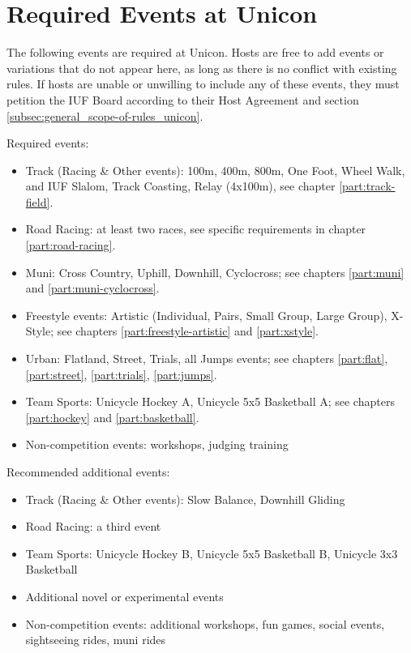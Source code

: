 \section{Required Events at Unicon}

The following events are required at Unicon.
Hosts are free to add events or variations that do not appear here, as long as there is no conflict with existing rules.
If hosts are unable or unwilling to include any of these events, they must petition the IUF Board according to their Host Agreement and section \ref{subsec:general_scope-of-rules_unicon}.

Required events:
\begin{itemize}
  \item Track (Racing \& Other events): 100m, 400m, 800m, One Foot, Wheel Walk, and IUF Slalom, Track Coasting, Relay (4x100m), see chapter \ref{part:track-field}.
  \item Road Racing: at least two races, see specific requirements in chapter \ref{part:road-racing}.
  \item Muni: Cross Country, Uphill, Downhill, Cyclocross; see chapters \ref{part:muni} and \ref{part:muni-cyclocross}.
  \item Freestyle events: Artistic (Individual, Pairs, Small Group, Large Group), X-Style; see chapters \ref{part:freestyle-artistic} and \ref{part:xstyle}.
  \item Urban: Flatland, Street, Trials, all Jumps events; see chapters \ref{part:flat}, \ref{part:street}, \ref{part:trials}, \ref{part:jumps}.
  \item Team Sports: Unicycle Hockey A, Unicycle 5x5 Basketball A; see chapters \ref{part:hockey} and \ref{part:basketball}.
  \item Non-competition events: workshops, judging training
\end{itemize}

Recommended additional events:
\begin{itemize}
  \item Track (Racing \& Other events): Slow Balance, Downhill Gliding
  \item Road Racing: a third event
  \item Team Sports: Unicycle Hockey B, Unicycle 5x5 Basketball B, Unicycle 3x3 Basketball
  \item Additional novel or experimental events
  \item Non-competition events: additional workshops, fun games, social events, sightseeing rides, muni rides
\end{itemize}

